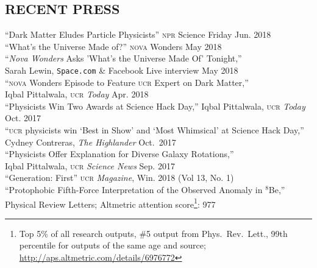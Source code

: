 \documentclass[margin,line]{resume}
\newcommand{\scap}[1]{\textsc{\MakeLowercase{#1}}}
\begin{document}
\begin{resume}

 

\section{\footnotesize \sc
\sffamily 
{}RECENT PRESS
}

``Dark Matter Eludes Particle Physicists''
\scap{NPR} Science Friday
\hfill Jun. 2018
\vspace{.7mm}
\\
``What's the Universe Made of?''
\scap{NOVA} Wonders 
\hfill May 2018
\vspace{.7mm}
\\
``\emph{Nova Wonders} Asks 'What's the Universe Made Of' Tonight,''\\
Sarah Lewin, \texttt{Space.com} \& Facebook Live interview  
\hfill May 2018
\vspace{.7mm}
\\
``\scap{NOVA} Wonders Episode to Feature \scap{UCR} Expert on Dark Matter,''\\
 Iqbal Pittalwala, 
 \scap{UCR} \emph{Today}
 \hfill Apr. 2018
\vspace{.7mm}
\\
``Physicists Win Two Awards at Science Hack Day,''
 Iqbal Pittalwala, 
 \scap{UCR} \emph{Today}
 \hfill Oct. 2017
\vspace{.7mm}
\\
``\scap{UCR} physicists win `Best in Show' and `Most Whimsical' at Science Hack Day,''\\
	Cydney Contreras, \emph{The Highlander}
	\hfill Oct.~2017\vspace{.7mm}
	\\
``Physicists Offer Explanation for Diverse Galaxy Rotations,''	\\
 Iqbal Pittalwala, 
 \scap{UCR} \emph{Science News}
 \hfill Sep. 2017
\vspace{.7mm}
\\
``Generation: First'' \scap{UCR} \emph{Magazine}, Win. 2018 (Vol 13, No. 1)
\\
``Protophobic Fifth-Force Interpretation of the Observed Anomaly in $^{8}$Be,''\\
	Physical Review Letters; 
	Altmetric attention score\footnote{Top 5\% of all research outputs, \#5 output from Phys.~Rev.~Lett., 99th percentile for outputs of the same age and source; \url{http://aps.altmetric.com/details/6976772}}: 977

\end{resume}
\end{document}

